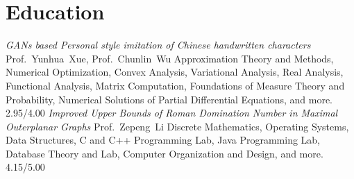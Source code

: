 \documentclass[11pt,a4paper, final]{moderncv}
\begin{document}
\clearpage
\maketitle
\section{\textbf{Education}}
	{\emph{GANs based Personal style imitation of Chinese handwritten characters}}
	{Prof.~Yunhua~Xue, Prof.~Chunlin~Wu}
	{Approximation Theory and Methods, Numerical Optimization, Convex Analysis, 
	Variational Analysis, Real Analysis, Functional Analysis, Matrix Computation, 
	Foundations of Measure Theory and Probability, Numerical Solutions of Partial Differential Equations, and more.}
	{2.95/4.00}
	{\emph{Improved Upper Bounds of Roman Domination Number in Maximal Outerplanar Graphs}}
	{Prof.~Zepeng~Li}
	{Discrete Mathematics, Operating Systems, Data Structures, C and C++ Programming Lab, 
	Java Programming Lab, Database Theory and Lab, Computer Organization and Design, and more.}
	{4.15/5.00}
\end{document}
